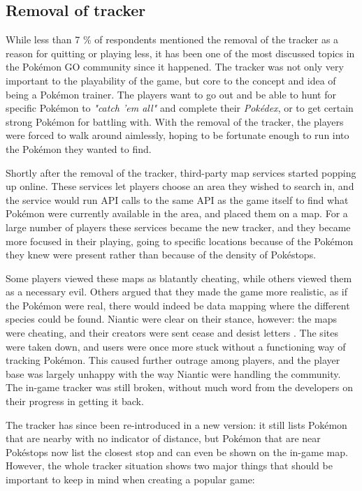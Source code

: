 \subsection{Removal of tracker}
While less than 7 \% of respondents mentioned the removal of the tracker as a reason for quitting or playing less, it has been one of the most discussed topics in the Pokémon GO community since it happened. The tracker was not only very important to the playability of the game, but core to the concept and idea of being a Pokémon trainer. The players want to go out and be able to hunt for specific Pokémon to \emph{"catch 'em all"} and complete their \emph{Pokédex}, or to get certain strong Pokémon for battling with. With the removal of the tracker, the players were forced to walk around aimlessly, hoping to be fortunate enough to run into the Pokémon they wanted to find.

Shortly after the removal of the tracker, third-party map services started popping up online. These services let players choose an area they wished to search in, and the service would run API calls to the same API as the game itself to find what Pokémon were currently available in the area, and placed them on a map. For a large number of players these services became the new tracker, and they became more focused in their playing, going to specific locations because of the Pokémon they knew were present rather than because of the density of Pokéstops.

Some players viewed these maps as blatantly cheating, while others viewed them as a necessary evil. Others argued that they made the game more realistic, as if the Pokémon were real, there would indeed be data mapping where the different species could be found. Niantic were clear on their stance, however: the maps were cheating, and their creators were sent cease and desist letters . The sites were taken down, and users were once more stuck without a functioning way of tracking Pokémon. This caused further outrage among players, and the player base was largely unhappy with the way Niantic were handling the community. The in-game tracker was still broken, without much word from the developers on their progress in getting it back.

The tracker has since been re-introduced in a new version: it still lists Pokémon that are nearby with no indicator of distance, but Pokémon that are near Pokéstops now list the closest stop and can even be shown on the in-game map. However, the whole tracker situation shows two major things that should be important to keep in mind when creating a popular game:

